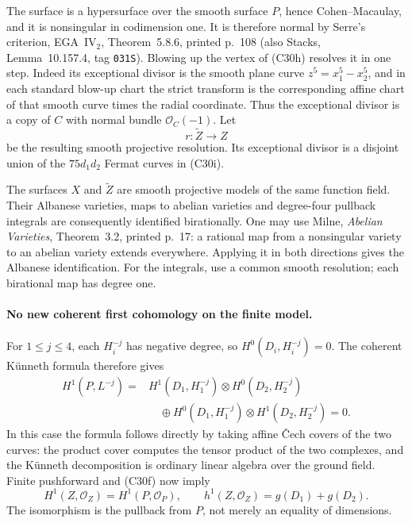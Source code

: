 \documentclass[11pt]{article}
\theoremstyle{definition}\newtheorem{definition}[theorem]{Definition}\newtheorem{remark}[theorem]{Remark}
\begin{document}
The surface is a hypersurface over the smooth surface
$P$, hence Cohen--Macaulay, and it is nonsingular in
codimension one.  It is therefore normal by Serre's
criterion, EGA~IV$_2$, Theorem~5.8.6, printed p.~108
(also Stacks, Lemma~10.157.4, tag \texttt{031S}).
Blowing up the vertex of (C30h) resolves it in one
step.  Indeed its exceptional divisor is the smooth
plane curve $z^5=x_1^5-x_2^5$, and in each standard
blow-up chart the strict transform is the corresponding
affine chart of that smooth curve times the radial
coordinate.  Thus the exceptional divisor is a copy
of $C$ with normal bundle $\mathcal O_C(-1)$.
Let
\[
                       r:\widetilde Z\longrightarrow Z
\]
be the resulting smooth projective resolution.  Its
exceptional divisor is a disjoint union of the
$75d_1d_2$ Fermat curves in (C30i).

The surfaces $X$ and $\widetilde Z$ are smooth
projective models of the same function field.  Their
Albanese varieties, maps to abelian varieties and
degree-four pullback integrals are consequently
identified birationally.  One may use Milne,
\emph{Abelian Varieties}, Theorem~3.2, printed p.~17:
a rational map from a nonsingular variety to an
abelian variety extends everywhere.  Applying it in
both directions gives the Albanese identification.
For the integrals, use a common smooth resolution;
each birational map has degree one.

\paragraph{No new coherent first cohomology on the finite model.}
For $1\leq j\leq4$, each $H_i^{-j}$ has negative
degree, so $H^0(D_i,H_i^{-j})=0$.  The coherent
K\"unneth formula therefore gives
\[
 \begin{aligned}
 H^1(P,L^{-j})={}&
 H^1(D_1,H_1^{-j})\otimes H^0(D_2,H_2^{-j})\\
 &\quad\oplus
 H^0(D_1,H_1^{-j})\otimes H^1(D_2,H_2^{-j})=0.
 \end{aligned}
                                                        \tag{C30j}
\]
In this case the formula follows directly by taking
affine \v Cech covers of the two curves: the product
cover computes the tensor product of the two
complexes, and the K\"unneth decomposition is ordinary
linear algebra over the ground field.
Finite pushforward and (C30f) now imply
\[
 H^1(Z,\mathcal O_Z)=H^1(P,\mathcal O_P),\qquad
 h^1(Z,\mathcal O_Z)=g(D_1)+g(D_2).
                                                        \tag{C30k}
\]
The isomorphism is the pullback from $P$, not merely
an equality of dimensions.
\end{document}
